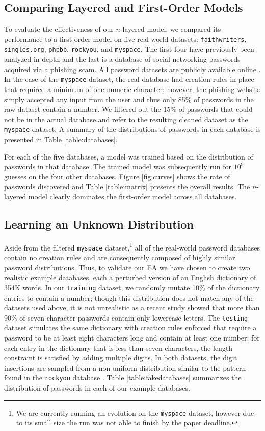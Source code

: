 \documentclass{acm_proc_article-sp}
\begin{document}
\subsection{Comparing Layered and First-Order Models}
To evaluate the effectiveness of our $n$-layered model, we compared its performance to a first-order model on five real-world datasets: \texttt{faithwriters}, \texttt{singles.org}, \texttt{phpbb}, \texttt{rockyou}, and \texttt{myspace}. The first four have previously been analyzed in-depth \cite{wier-ccs10} and the last is a database of social networking passwords acquired via a phishing scam. All password datasets are publicly available online \cite{skullsecurity}. In the case of the \texttt{myspace} dataset, the real database had creation rules in place that required a minimum of one numeric character; however, the phishing website simply accepted any input from the user and thus only 85\% of passwords in the raw dataset contain a number. We filtered out the 15\% of passwords that could not be in the actual database and refer to the resulting cleaned dataset as the \texttt{myspace} dataset. A summary of the distributions of passwords in each database is presented in Table \ref{table:databases}.

For each of the five databases, a model was trained based on the distribution of passwords in that database. The trained model was subsequently run for $10^{9}$ guesses on the four other databases. Figure \ref{fig:curves} shows the rate of passwords discovered and Table \ref{table:matrix} presents the overall results. The $n$-layered model clearly dominates the first-order model across all databases.

\subsection{Learning an Unknown Distribution}
Aside from the filtered \texttt{myspace} dataset,\footnote{We are currently running an evolution on the \texttt{myspace} dataset, however due to its small size the run was not able to finish by the paper deadline.} all of the real-world password databases contain no creation rules and are consequently composed of highly similar password distributions. Thus, to validate our EA we have chosen to create two realistic example databases, each a perturbed version of an English dictionary of 354K words. In our \texttt{training} dataset, we randomly mutate 10\% of the dictionary entries to contain a number; though this distribution does not match any of the datasets used above, it is not unrealistic as a recent study \cite{florencio-www07} showed that more than 90\% of seven-character passwords contain only lowercase letters. The \texttt{testing} dataset simulates the same dictionary with creation rules enforced that require a password to be at least eight characters long and contain at least one number; for each entry in the dictionary that is less than seven characters, the length constraint is satisfied by adding multiple digits. In both datasets, the digit insertions are sampled from a non-uniform distribution similar to the pattern found in the \texttt{rockyou} database \cite{wier-ccs10}. Table \ref{table:fakedatabases} summarizes the distribution of passwords in each of our example databases.
\end{document}
